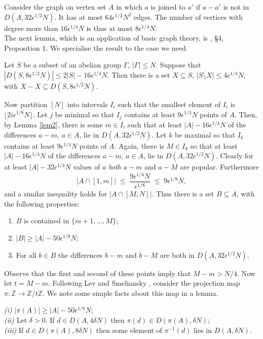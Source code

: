 \documentclass[a4paper,12pt]{article}
\begin{document}
\proof Consider the graph on vertex set $A$ in which $a$ is joined to $a'$ if $a - a'$ is not in $D(A,32\epsilon^{1/2} N)$. It has at most $64\epsilon^{1/2} N^2$ edges. The number of vertices with degree more than $16\epsilon^{1/4} N$ is thus at most $8\epsilon^{1/4} N$.\endproof\\[11pt]
The next lemma, which is an application of basic graph theory, is \cite{LLS}, \S 4, Proposition 1. We specialise the result to the case we need.
\begin{lemmaenv}\label{LLSlem} Let $S$ be a subset of an abelian group $\Gamma$, $|\Gamma| \leq N$. Suppose that $|D(S,8\epsilon^{1/2}N)| \leq 2|S| - 16\epsilon^{1/4}N$. Then there is a set $X \subseteq S$, $|S \setminus X| \leq 4\epsilon^{1/4}N$, with $X - X \subseteq D(S,8\epsilon^{1/2}N)$.
\end{lemmaenv}
Now partition $[N]$ into intervals $I_i$ such that the smallest element of $I_i$ is $\lfloor 2i\epsilon^{1/8} N\rfloor$. Let $j$ be minimal so that $I_j$ contains at least $9\epsilon^{1/4}N$ points of $A$. Then, by Lemma \ref{lem2}, there is some $m \in I_i$ such that at least $|A| - 16\epsilon^{1/4}N$ of the differences $a - m$, $a \in A$, lie in $D(A,32\epsilon^{1/2} N)$. Let $k$ be maximal so that $I_k$ contains at least $9\epsilon^{1/4}N$ points of $A$. Again, there is $M \in I_k$ so that at least $|A|-16\epsilon^{1/4}N$ of the differences $a - m$, $a \in A$, lie in $D(A,32\epsilon^{1/2} N)$. Clearly for at least $|A|-32\epsilon^{1/4}N$ values of $a$ \textit{both} $a - m$ and $a - M$ are popular. Furthermore
\[ |A \cap [1,m]| \; \leq \; \frac{9\epsilon^{1/4}N}{\epsilon^{1/8}} \; \leq \; 9\epsilon^{1/8}N,\] and a similar inequality holds for $|A \cap [M,N]|$. Thus there is a set $B \subseteq A$, with the following properties:
\begin{enumerate}
\item $B$ is contained in $\{m + 1,\dots,M\}$;
\item $|B| \geq |A| - 50\epsilon^{1/8}N$;
\item For all $b \in B$ the differences $b - m$ and $b - M$ are both in $D(A,32\epsilon^{1/2} N)$.
\end{enumerate}
Observe that the first and second of these points imply that $M - m > N/4$.
Now let $t = M - m$. Following Lev and Smeliansky \cite{LevSmel}, consider the projection map $\pi : \mathbb{Z} \rightarrow \mathbb{Z}/t\mathbb{Z}$. We note some simple facts about this map in a lemma.
\begin{lemmaenv}\label{facts}
\emph{(i)} $|\pi(A)|  \geq  |A|-50\epsilon^{1/8}N$;\\
\emph{(ii)} Let $\delta > 0$. If $d \in D(A,4\delta N)$ then $\pi(d) \in D(\pi(A),\delta N)$;\\
\emph{(iii)} If $d \in D(\pi(A),8\delta N)$ then some element of $\pi^{-1}(d)$ lies in $D(A,\delta N)$.
\end{lemmaenv}
\end{document}
